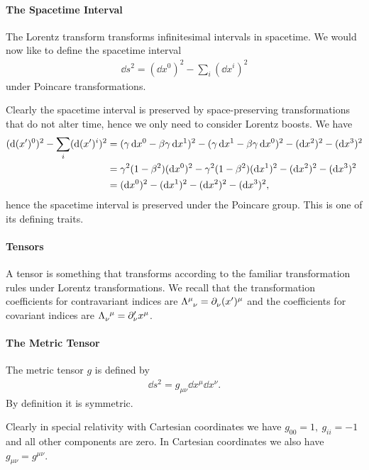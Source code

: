 \paragraph{The Spacetime Interval}
The Lorentz transform transforms infinitesimal intervals in spacetime. We would now like to define the spacetime interval
\begin{align*}
	\dd{s}^{2} = (\dd{x^{0}})^{2} - \sum\limits_{i}(\dd{x^{i}})^{2}
\end{align*}
under Poincare transformations.

Clearly the spacetime interval is preserved by space-preserving transformations that do not alter time, hence we only need to consider Lorentz boosts. We have
\begin{align*}
	(\dd{(x^{\prime})^{0}})^{2} - \sum\limits_{i}(\dd{(x^{\prime})^{i}})^{2} &= (\gamma\dd{x^{0}} - \beta\gamma\dd{x^{1}})^{2} - (\gamma\dd{x^{1}} - \beta\gamma\dd{x^{0}})^{2} - (\dd{x^{2}})^{2} - (\dd{x^{3}})^{2} \\
	                                                           &= \gamma^{2}(1 - \beta^{2})(\dd{x^{0}})^{2} - \gamma^{2}(1 - \beta^{2})(\dd{x^{1}})^{2} - (\dd{x^{2}})^{2} - (\dd{x^{3}})^{2} \\
	                                                           &= (\dd{x^{0}})^{2} - (\dd{x^{1}})^{2} - (\dd{x^{2}})^{2} - (\dd{x^{3}})^{2},
\end{align*}
hence the spacetime interval is preserved under the Poincare group. This is one of its defining traits.

\paragraph{Tensors}
A tensor is something that transforms according to the familiar transformation rules under Lorentz transformations. We recall that the transformation coefficients for contravariant indices are $\tensor{\Lambda}{^{\mu}_{\nu}} = \del{\nu}{(x\p)^{\mu}}$ and the coefficients for covariant indices are $\tensor{\Lambda}{_{\nu}^{\mu}} = \del[\prime]{\nu}{x^{\mu}}$.

\paragraph{The Metric Tensor}
The metric tensor $g$ is defined by
\begin{align*}
	\dd{s}^{2} = g_{\mu\nu}\dd{x^{\mu}}\dd{x^{\nu}}.
\end{align*}
By definition it is symmetric.

Clearly in special relativity with Cartesian coordinates we have $g_{00} = 1,\ g_{ii} = -1$ and all other components are zero. In Cartesian coordinates we also have $g_{\mu\nu} = g^{\mu\nu}$.